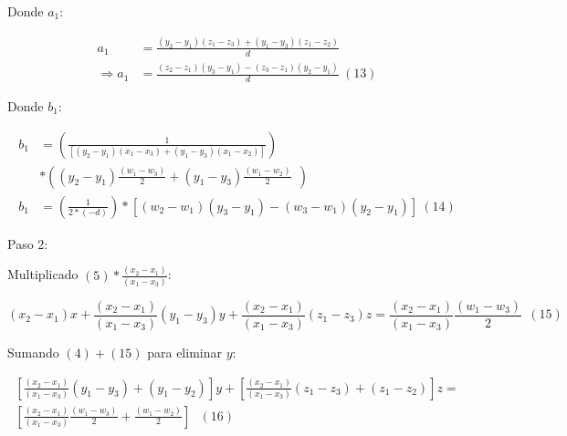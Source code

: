          Donde  $a_{1}$:
        
        \begin{align*}
         a_{1}&=\frac{ \left( y_{2}-y_{1} \right)  \left( z_{1}-z_{3} \right) + \left( y_{1}-y_{3} \right)  \left( z_{1}-z_{2} \right) }{d}\\
         \Longrightarrow a_{1}&=\frac{ \left( z_{2}-z_{1} \right)  \left( y_{3}-y_{1} \right) - \left( z_{3}-z_{1} \right)  \left( y_{2}-y_{1} \right) }{d}~  \left( 13 \right) 
        \end{align*}
        
        Donde  $b_{1}$:

        \begin{align*}
             b_{1}&= \left( \frac{1}{ \left[  \left( y_{2}-y_{1} \right)  \left( x_{1}-x_{3} \right) +  \left( y_{1}-y_{3} \right)  \left( x_{1}-x_{2} \right)  \right] } \right) \\ &\ast \left(  \left( y_{2}-y_{1} \right) \frac{ \left( w_{1} - w_{3} \right) }{2}+ \left( y_{1}-y_{3} \right) \frac{ \left( w_{1} - w_{2} \right) }{2}~~ \right)    \\                 
             b_{1}&= \left( \frac{1}{2\ast \left( -d \right) } \right) \ast \left[  \left( w_{2} - w_{1} \right)  \left( y_{3}-y_{1} \right) - \left( w_{3} - w_{1} \right)  \left( y_{2}-y_{1} \right)  \right] ~  \left( 14 \right) 
        \end{align*}

        
Paso 2:
        
        Multiplicado $(5)\ast\frac{ \left( x_{2}-x_{1} \right) }{ \left( x_{1}-x_{3} \right) }$:

        \begin{equation*}
             \left( x_{2}-x_{1} \right) x+\frac{ \left( x_{2}-x_{1} \right) }{ \left( x_{1}-x_{3} \right) } \left( y_{1}-y_{3} \right) y+\frac{ \left( x_{2}-x_{1} \right) }{ \left( x_{1}-x_{3} \right) } \left( z_{1}-z_{3} \right) z= \frac{ \left( x_{2}-x_{1} \right) }{ \left( x_{1}-x_{3} \right) }\frac{ \left( w_{1} - w_{3} \right) }{2}~~ \left( 15 \right) 
        \end{equation*}

        Sumando $(4) +(15)$ para eliminar $y$:
        
        \begin{multline*}
             \left[ \frac{ \left( x_{2}-x_{1} \right) }{ \left( x_{1}-x_{3} \right) } \left( y_{1}-y_{3} \right) +  \left( y_{1}-y_{2} \right)  \right] y+ \left[ \frac{ \left( x_{2}-x_{1} \right) }{ \left( x_{1}-x_{3} \right) } \left( z_{1}-z_{3} \right) + \left( z_{1}-z_{2} \right)  \right] z= \\ \left[ \frac{ \left( x_{2}-x_{1} \right) }{ \left( x_{1}-x_{3} \right) }\frac{ \left( w_{1} - w_{3} \right) }{2}+\frac{ \left( w_{1} - w_{2} \right) }{2} \right] ~~~ \left( 16 \right)
        \end{multline*}

